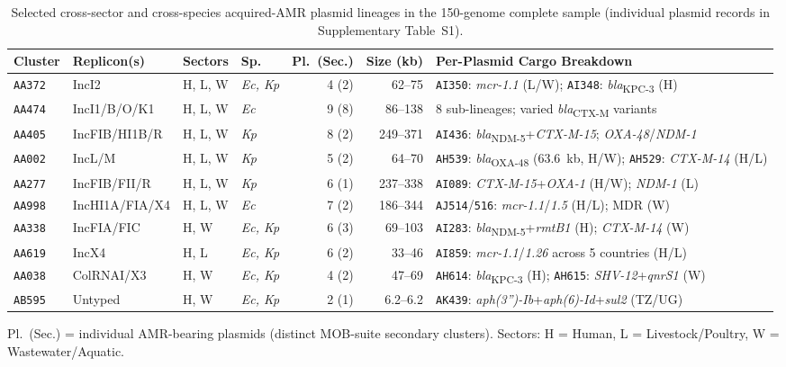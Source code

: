 \documentclass[11pt,a4paper]{article}
\begin{document}
\begin{table}[!htbp]
\centering
\caption{Selected cross-sector and cross-species acquired-AMR plasmid lineages in the 150-genome complete sample (individual plasmid records in Supplementary Table~S1).}
\label{tab:plasmids}
\footnotesize
\setlength{\tabcolsep}{4pt}
\begin{tabularx}{\linewidth}{@{}l l l l r r X@{}}
\toprule
\textbf{Cluster} & \textbf{Replicon(s)} & \textbf{Sectors} & \textbf{Sp.} & \textbf{Pl.\ (Sec.)} & \textbf{Size (kb)} & \textbf{Per-Plasmid Cargo Breakdown} \\
\midrule
\texttt{AA372} & IncI2 & H, L, W & \textit{Ec, Kp} & 4 (2) & 62--75 & \texttt{AI350}: \textit{mcr-1.1} (L/W); \texttt{AI348}: \textit{bla}\textsubscript{KPC-3} (H) \\
\texttt{AA474} & IncI1/B/O/K1 & H, L, W & \textit{Ec} & 9 (8) & 86--138 & 8 sub-lineages; varied \textit{bla}\textsubscript{CTX-M} variants \\
\texttt{AA405} & IncFIB/HI1B/R & H, L, W & \textit{Kp} & 8 (2) & 249--371 & \texttt{AI436}: \textit{bla}\textsubscript{NDM-5}+\textit{CTX-M-15}; \textit{OXA-48}/\textit{NDM-1} \\
\texttt{AA002} & IncL/M & H, L, W & \textit{Kp} & 5 (2) & 64--70 & \texttt{AH539}: \textit{bla}\textsubscript{OXA-48} (63.6~kb, H/W); \texttt{AH529}: \textit{CTX-M-14} (H/L) \\
\texttt{AA277} & IncFIB/FII/R & H, L, W & \textit{Kp} & 6 (1) & 237--338 & \texttt{AI089}: \textit{CTX-M-15}+\textit{OXA-1} (H/W); \textit{NDM-1} (L) \\
\texttt{AA998} & IncHI1A/FIA/X4 & H, L, W & \textit{Ec} & 7 (2) & 186--344 & \texttt{AJ514}/\texttt{516}: \textit{mcr-1.1}/\textit{1.5} (H/L); MDR (W) \\
\texttt{AA338} & IncFIA/FIC & H, W & \textit{Ec, Kp} & 6 (3) & 69--103 & \texttt{AI283}: \textit{bla}\textsubscript{NDM-5}+\textit{rmtB1} (H); \textit{CTX-M-14} (W) \\
\texttt{AA619} & IncX4 & H, L & \textit{Ec, Kp} & 6 (2) & 33--46 & \texttt{AI859}: \textit{mcr-1.1}/\textit{1.26} across 5 countries (H/L) \\
\texttt{AA038} & ColRNAI/X3 & H, W & \textit{Ec, Kp} & 4 (2) & 47--69 & \texttt{AH614}: \textit{bla}\textsubscript{KPC-3} (H); \texttt{AH615}: \textit{SHV-12}+\textit{qnrS1} (W) \\
\texttt{AB595} & Untyped & H, W & \textit{Ec, Kp} & 2 (1) & 6.2--6.2 & \texttt{AK439}: \textit{aph(3'')-Ib}+\textit{aph(6)-Id}+\textit{sul2} (TZ/UG) \\
\bottomrule
\end{tabularx}
\vspace{2pt}
\raggedright\footnotesize{Pl.\ (Sec.) = individual AMR-bearing plasmids (distinct MOB-suite secondary clusters). Sectors: H = Human, L = Livestock/Poultry, W = Wastewater/Aquatic.}
\end{table}
\end{document}

